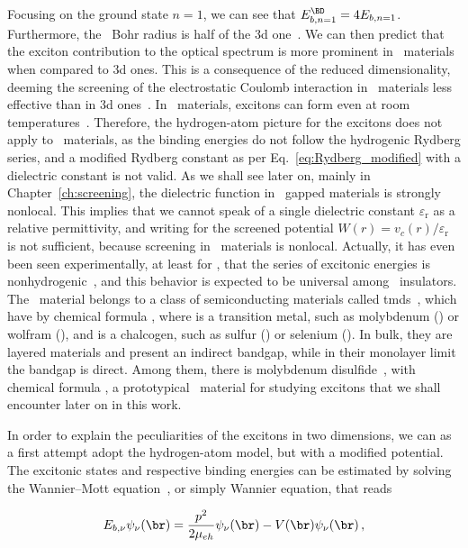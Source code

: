 Focusing on the ground state $n=1$, we can see that $E^{\BD}_{b,n=1} = 4 E_{b,n=1}$.
Furthermore, the \bd~Bohr radius is half of the \gls{3d} one~\cite{2D_Hydrogen_atom_1991}.
We can then predict that the exciton contribution to the optical spectrum is more prominent in \bd~materials when compared to \gls{3d} ones.
This is a consequence of the reduced dimensionality, deeming the screening of the electrostatic Coulomb interaction in \bd~materials less effective than in \gls{3d} ones~\cite{Cudazzo_2011}.
In \bd~materials, excitons can form even at room temperatures~\cite{Morozov_Wolff_Mortensen_2021}.
Therefore, the hydrogen-atom picture for the excitons does not apply to \bd~materials, as the binding energies do not follow the hydrogenic Rydberg series, and a modified Rydberg constant as per Eq.~\eqref{eq:Rydberg_modified} with a dielectric constant is not valid.
As we shall see later on, mainly in Chapter~\ref{ch:screening}, the dielectric function in \bd~gapped materials is strongly nonlocal.
This implies that we cannot speak of a single dielectric constant $\varepsilon_{\mathrm{r}}$ as a relative permittivity, and writing for the screened potential $W(r) = v_c(r)/\varepsilon_{\mathrm{r}}$ is not sufficient, because screening in \bd~materials is nonlocal.
Actually, it has even been seen experimentally, at least for , that the series of excitonic energies is nonhydrogenic~\cite{Chernikov_2014}, and this behavior is expected to be universal among \bd~insulators.
The \bd~material  belongs to a class of semiconducting materials called \glspl{tmd}~\cite{Manzeli_Ovchinnikov_Pasquier_Yazyev_Kis_2017}, which have by chemical formula , where  is a transition metal, such as molybdenum () or wolfram (), and  is a chalcogen, such as sulfur () or selenium ().
In bulk, they are layered materials and present an indirect bandgap, while in their monolayer limit the bandgap is direct.
Among them, there is molybdenum disulfide~\cite{Singh_Kumar_Late_Kumar_Patel_Singh_2018}, with chemical formula , a prototypical \bd~material for studying excitons that we shall encounter later on in this work.

In order to explain the peculiarities of the excitons in two dimensions, we can as a first attempt adopt the hydrogen-atom model, but with a modified potential.
The excitonic states and respective binding energies can be estimated by solving the Wannier--Mott equation~\cite{Wannier_1937}, or simply Wannier equation, that reads

\begin{equation}
    E_{b, \nu} \psi_\nu (\br) =  \frac{p ^2}{2 \mu_{eh}} \psi_\nu (\br) - V(\br) \psi_\nu (\br)\,,
\label{eq:Wannier_equation}
\end{equation}

